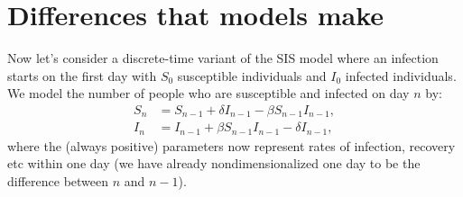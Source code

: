 \documentclass[a4paper,12pt]{article}
\begin{document}
\section{Differences that models make}
    Now let's consider a discrete-time variant of the SIS model where an infection starts on the first day with $S_0$ susceptible individuals and $I_0$ infected individuals. We model the number of people who are susceptible and infected on day $n$ by:
    \begin{align*}
        S_{n} &= S_{n-1}+ \delta I_{n-1} - \beta S_{n-1}I_{n-1},\\
        I_n &= I_{n-1} +\beta S_{n-1}I_{n-1}-\delta I_{n-1},
    \end{align*}
    where the (always positive) parameters now represent rates of infection, recovery etc within one day (we have already nondimensionalized one day to be the difference between $n$ and $n-1$).
\end{document}
